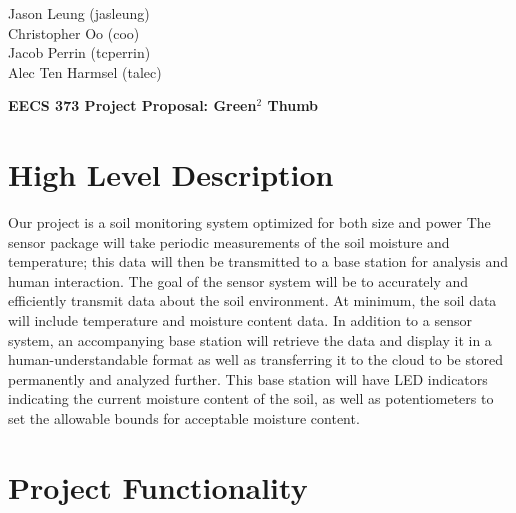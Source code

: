 \documentclass{article}
\begin{document}
\begin{flushright}
    Jason Leung (jasleung)\\
    Christopher Oo (coo)\\
    Jacob Perrin (tcperrin)\\
    Alec Ten Harmsel (talec)
\end{flushright}

\begin{center}
    {\LARGE
        \textbf{EECS 373 Project Proposal: Green$^2$ Thumb}
    }
\end{center}

\section{High Level Description}
Our project is a soil monitoring system optimized for both size and power The
sensor package will take periodic measurements of the soil moisture and
temperature; this data will then be transmitted to a base station for analysis
and human interaction. The goal of the sensor system will be to accurately and
efficiently transmit data about the soil environment. At minimum, the soil data
will include temperature and moisture content data. In addition to a sensor
system, an accompanying base station will retrieve the data and display it in a
human-understandable format as well as transferring it to the cloud to be
stored permanently and analyzed further. This base station will have LED
indicators indicating the current moisture content of the soil, as well as
potentiometers to set the allowable bounds for acceptable moisture content.

\section{Project Functionality}
\end{document}
